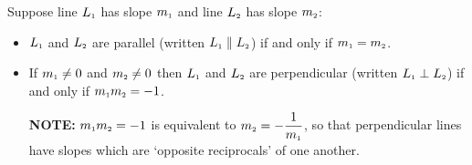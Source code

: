 \medskip

\colorbox{ResultColor}{\bbm


\begin{thm}  Suppose line $L_{\mbox{\tiny$1$}}$ has slope $m_{\mbox{\tiny$1$}}$ and line $L_{\mbox{\tiny$2$}}$ has slope $m_{\mbox{\tiny$2$}}$:


\label{parallelperpendicularslopetheorem}


\begin{itemize}

\item $L_{\mbox{\tiny$1$}}$ and $L_{\mbox{\tiny$2$}}$ are parallel (written $L_{\mbox{\tiny$1$}} \parallel L_{\mbox{\tiny$2$}}$) if and only if $m_{\mbox{\tiny$1$}} = m_{\mbox{\tiny$2$}}$.

\item If $m_{\mbox{\tiny$1$}} \neq 0$ and  $m_{\mbox{\tiny$2$}} \neq 0$ then $L_{\mbox{\tiny$1$}}$ and $L_{\mbox{\tiny$2$}}$ are perpendicular (written $L_{\mbox{\tiny$1$}} \perp L_{\mbox{\tiny$2$}}$) if and only if $m_{\mbox{\tiny$1$}} m_{\mbox{\tiny$2$}} = -1$.

\textbf{NOTE:} $m_{\mbox{\tiny$1$}} m_{\mbox{\tiny$2$}} = -1$  is equivalent to $m_{\mbox{\tiny$2$}} = -\dfrac{1}{m_{\mbox{\tiny$1$}}}$, so that perpendicular lines have slopes which are `opposite reciprocals' of one another.

\end{itemize}

\end{thm}

\ebm}

